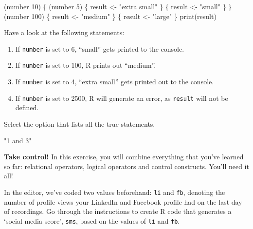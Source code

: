 \documentclass[]{article}
\providecommand{\tightlist}{%
  \setlength{\itemsep}{0pt}\setlength{\parskip}{0pt}}
\newcommand{\hlnum}[1]{\textcolor[rgb]{0.816,0.125,0.439}{#1}}%
\newcommand{\hlstr}[1]{\textcolor[rgb]{0.251,0.627,0.251}{#1}}%
\newcommand{\hlstd}[1]{\textcolor[rgb]{0.251,0.251,0.251}{#1}}%
\newcommand{\hlkwd}[1]{\textcolor[rgb]{0.878,0.439,0.125}{#1}}%
\newenvironment{Shaded}{\begin{myshaded}}{\end{myshaded}}
\renewenvironment{verbatim}{\color{codecolor}\begin{myshaded}\begin{oldverbatim}}{\end{oldverbatim}\end{myshaded}}
\newcommand{\KeywordTok}[1]{\hlkwd{#1}}
\newcommand{\DecValTok}[1]{\hlnum{#1}}
\newcommand{\StringTok}[1]{\hlstr{#1}}
\newcommand{\NormalTok}[1]{\hlstd{#1}}
\begin{document}
\begin{Shaded}
\begin{Highlighting}[]
\NormalTok{ (number }\OperatorTok{<}\StringTok{ }\DecValTok{10}\NormalTok{) \{}
\NormalTok{ (number }\OperatorTok{<}\StringTok{ }\DecValTok{5}\NormalTok{) \{}
\NormalTok{result <-}\StringTok{ "extra small"}
\NormalTok{\} }\NormalTok{ \{}
\NormalTok{result <-}\StringTok{ "small"}
\NormalTok{\}}
\NormalTok{\} } \NormalTok{ (number }\OperatorTok{<}\StringTok{ }\DecValTok{100}\NormalTok{) \{}
\NormalTok{result <-}\StringTok{ "medium"}
\NormalTok{\} }\NormalTok{ \{}
\NormalTok{result <-}\StringTok{ "large"}
\NormalTok{\}}
\KeywordTok{print}\NormalTok{(result)}
\end{Highlighting}
\end{Shaded}

Have a look at the following statements:

\begin{enumerate}
\def\labelenumi{\arabic{enumi}.}
\tightlist
\item
  If \texttt{number} is set to 6, ``small'' gets printed to the console.
\item
  If \texttt{number} is set to 100, R prints out ``medium''.
\item
  If \texttt{number} is set to 4, ``extra small'' gets printed out to
  the console.
\item
  If \texttt{number} is set to 2500, R will generate an error, as
  \texttt{result} will not be defined.
\end{enumerate}

Select the option that lists all the true statements.

\begin{verbatim}
   [1] "1 and 3"
\end{verbatim}

\textbf{Take control!} In this exercise, you will combine everything
that you've learned so far: relational operators, logical operators and
control constructs. You'll need it all!

In the editor, we've coded two values beforehand: \texttt{li} and
\texttt{fb}, denoting the number of profile views your LinkedIn and
Facebook profile had on the last day of recordings. Go through the
instructions to create R code that generates a `social media score',
\texttt{sms}, based on the values of \texttt{li} and \texttt{fb}.
\end{document}
